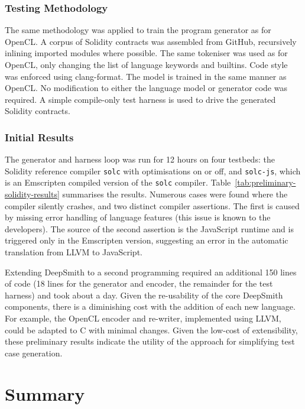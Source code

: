 \subsubsection{Testing Methodology}

The same methodology was applied to train the program generator as for OpenCL. A corpus of Solidity contracts was assembled from GitHub, recursively inlining imported modules where possible. The same tokeniser was used as for OpenCL, only changing the list of language keywords and builtins. Code style was enforced using clang-format. The model is trained in the same manner as OpenCL. No modification to either the language model or generator code was required. A simple compile-only test harness is used to drive the generated Solidity contracts.


\subsubsection{Initial Results}

The generator and harness loop was run for 12 hours on four testbeds: the Solidity reference compiler \texttt{solc} with optimisations on or off, and \texttt{solc-js}, which is an Emscripten compiled version of the \texttt{solc} compiler. Table~\ref{tab:preliminary-solidity-results} summarises the results. Numerous cases were found where the compiler silently crashes, and two distinct compiler assertions. The first is caused by missing error handling of language features (this issue is known to the developers). The source of the second assertion is the JavaScript runtime and is triggered only in the Emscripten version, suggesting an error in the automatic translation from LLVM to JavaScript.

Extending DeepSmith to a second programming required an additional 150 lines of code (18 lines for the generator and encoder, the remainder for the test harness) and took about a day. Given the re-usability of the core DeepSmith components, there is a diminishing cost with the addition of each new language. For example, the OpenCL encoder and re-writer, implemented using LLVM, could be adapted to C with minimal changes. Given the low-cost of extensibility, these preliminary results indicate the utility of the approach for simplifying test case generation.


\section{Summary}
\label{sec:deepsmith-conclusion}

